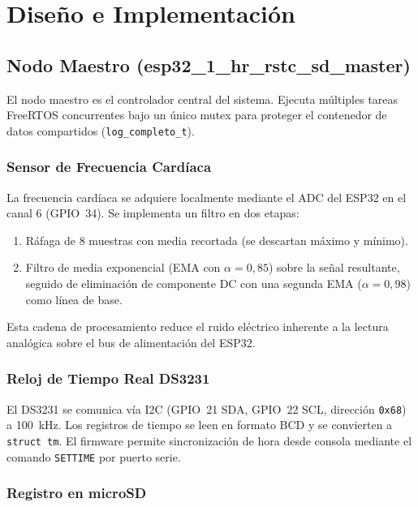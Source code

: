 \documentclass[10pt,twocolumn,a4paper]{article}
\begin{document}
\section{Diseño e Implementación}
\label{sec:impl}

\subsection{Nodo Maestro (esp32\_1\_hr\_rstc\_sd\_master)}

El nodo maestro es el controlador central del sistema. Ejecuta múltiples
tareas FreeRTOS concurrentes bajo un único mutex para proteger el
contenedor de datos compartidos (\texttt{log\_completo\_t}).

\subsubsection{Sensor de Frecuencia Cardíaca}

La frecuencia cardíaca se adquiere localmente mediante el ADC del ESP32
en el canal 6 (GPIO~34). Se implementa un filtro en dos etapas:
\begin{enumerate}
  \item Ráfaga de 8 muestras con media recortada (se descartan máximo y
        mínimo).
  \item Filtro de media exponencial (EMA con $\alpha=0{,}85$) sobre la
        señal resultante, seguido de eliminación de componente DC con
        una segunda EMA ($\alpha=0{,}98$) como línea de base.
\end{enumerate}

Esta cadena de procesamiento reduce el ruido eléctrico inherente a la
lectura analógica sobre el bus de alimentación del ESP32.

\subsubsection{Reloj de Tiempo Real DS3231}

El DS3231 se comunica vía I2C (GPIO~21 SDA, GPIO~22 SCL, dirección
\texttt{0x68}) a 100~kHz. Los registros de tiempo se leen en formato
BCD y se convierten a \texttt{struct~tm}. El firmware permite
sincronización de hora desde consola mediante el comando \texttt{SETTIME}
por puerto serie.

\subsubsection{Registro en microSD}
\end{document}
